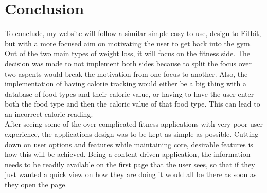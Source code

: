 \section{Conclusion}
To conclude, my website will follow a similar simple easy to use, design to Fitbit, but with a more focused aim on motivating the user to get back into the gym. Out of the two main types of weight loss, it will focus on the fitness side. The decision was made to not implement both sides because to split the focus over two aspents would break the motivation from one focus to another. Also, the implementation of having calorie tracking would either be a big thing with a database of food types and their caloric value, or having to have the user enter both the food type and then the caloric value of that food type. This can lead to an incorrect caloric reading.\\

After seeing some of the over-complicated fitness applications with very poor user experience, the applications design was to be kept as simple as possible. Cutting down on user options and features while maintaining core, desirable features is how this will be achieved. Being a content driven application, the information needs to be readily available on the first page that the user sees, so that if they just wanted a quick view on how they are doing it would all be there as soon as they open the page.
